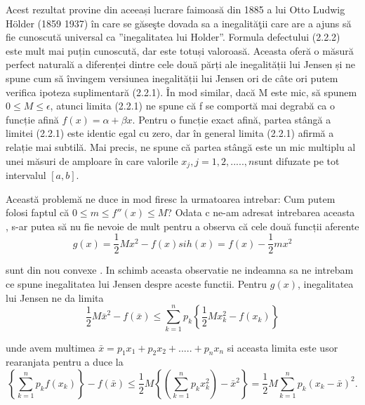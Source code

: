 \documentclass[a4paper,12pt,oneside]{report}
\begin{document}
Acest rezultat provine din aceeași lucrare faimoasă din 1885 a lui Otto Ludwig Hölder (1859 1937) în care se găseşte dovada sa a inegalităţii care are a ajuns să fie cunoscută universal ca ”inegalitatea lui Holder”. Formula defectului (2.2.2) este mult mai puțin cunoscută, dar este totuși valoroasă. Aceasta oferă o măsură perfect naturală a diferenței dintre cele două părți ale inegalității lui Jensen și ne spune cum să învingem versiunea  inegalității lui Jensen ori de câte ori putem verifica ipoteza suplimentară (2.2.1). 
În mod similar, dacă M este mic, să spunem \(0 \leq M \leq \epsilon\), atunci limita (2.2.1) ne spune că f se comportă mai degrabă ca o funcție afină \(f\left ( x \right ) = \alpha  + \beta x\). Pentru o funcție exact afină, partea stângă a limitei (2.2.1) este identic egal cu zero, dar în general limita (2.2.1) afirmă a relație mai subtilă. Mai precis, ne spune că partea stângă este un mic multiplu al unei măsuri de amploare  în care valorile \(x_{j}, j = 1,2,.....,n \)sunt difuzate pe tot intervalul \(\left [ a, b \right ]. \)

Această problemă ne duce in mod firesc la urmatoarea intrebar: Cum putem folosi faptul că \(0\leq m\leq {f}''\left ( x \right )\leq M \)? Odata c ne-am adresat intrebarea aceasta , s-ar putea să nu fie nevoie de mult pentru a observa că cele două funcții aferente
\begin{displaymath}
  g\left ( x \right ) = \frac{1}{2}Mx^{2} - f\left ( x \right ) si 
h\left ( x \right ) = f\left ( x \right ) - \frac{1}{2}mx^{2}
\end{displaymath}

sunt din nou convexe . In schimb aceasta observatie ne indeamna sa ne intrebam ce spune inegalitatea lui Jensen despre aceste functii. 
	Pentru \(g\left ( x \right )\), inegalitatea lui Jensen ne da limita 
\begin{displaymath}
  \frac{1}{2}M\bar{x}^{2} - f\left ( \bar{x} \right )\leq \sum_{k = 1}^{n}p_{k}\left \{ \frac{1}{2}Mx_{k}^{2} - f\left ( x_{k} \right )\right \}
\end{displaymath}

unde avem multimea \(\bar{x} = p_{1}x_{1}+ p_{2}x_{2}+ ..... + p_{n}x_{n}\) si aceasta limita este usor rearanjata pentru a duce la 
\begin{displaymath}
  \left \{ \sum_{k = 1}^{n} p_{k}f\left ( x_{k} \right )\right \} - f\left (\bar{x}  \right )\leq \frac{1}{2}M\left \{ \left ( \sum_{k=1}^{n} p_{k}x_{k}^{2}\right ) - \bar{x}^{2} \right \} = \frac{1}{2}M\sum_{k = 1}^{n}p_{k}\left ( x_{k} - \bar{x} \right )^{2}. 
\end{displaymath}
\end{document}
